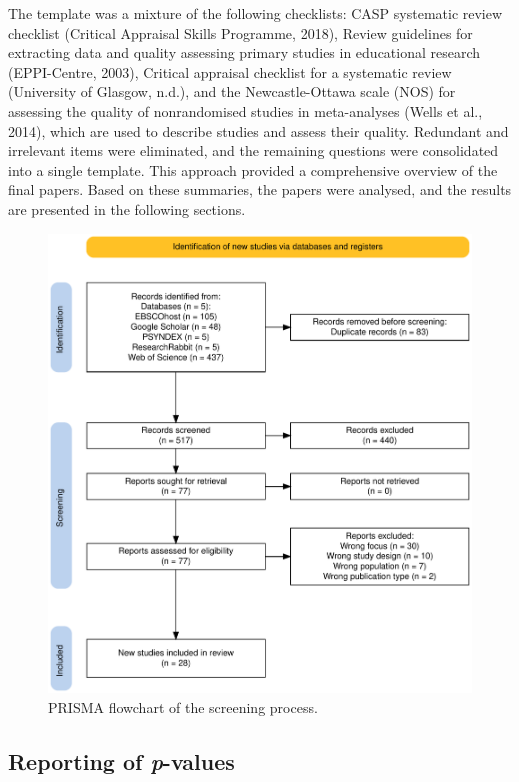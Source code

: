 \documentclass[
  stu, a4paper,floatsintext]{apa7}
\begin{document}
The template was a mixture of the following checklists: CASP systematic review checklist (Critical Appraisal Skills Programme, 2018), Review guidelines for extracting data and quality assessing primary studies in educational research (EPPI-Centre, 2003), Critical appraisal checklist for a systematic review (University of Glasgow, n.d.), and the Newcastle-Ottawa scale (NOS) for assessing the quality of nonrandomised studies in meta-analyses (Wells et al., 2014), which are used to describe studies and assess their quality.
Redundant and irrelevant items were eliminated, and the remaining questions were consolidated into a single template.
This approach provided a comprehensive overview of the final papers.
Based on these summaries, the papers were analysed, and the results are presented in the following sections.

\begin{figure}
\centering
\includegraphics{files/prisma.pdf}
\caption{\label{fig:prisma}PRISMA flowchart of the screening process.}
\end{figure}

\subsection{\texorpdfstring{Reporting of \emph{p}-values}{Reporting of p-values}}\label{reporting-of-p-values}
\end{document}
